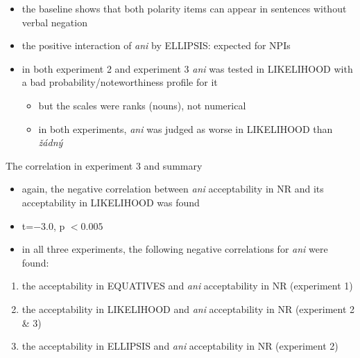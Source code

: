 \documentclass[
  ignorenonframetext,
]{beamer}
\providecommand{\tightlist}{%
  \setlength{\itemsep}{0pt}\setlength{\parskip}{0pt}}\usepackage{longtable,booktabs,array}
\newcommand{\cond}[1]{\textsc{#1}}
\begin{document}
\begin{frame}
\begin{itemize}
\tightlist
\item
  the baseline shows that both polarity items can appear in sentences
  without verbal negation
\item
  the positive interaction of \emph{ani} by \cond{ELLIPSIS}: expected
  for NPIs
\item
  in both experiment 2 and experiment 3 \emph{ani} was tested in
  \cond{LIKELIHOOD} with a bad probability/noteworthiness profile for it

  \begin{itemize}
  \tightlist
  \item
    but the scales were ranks (nouns), not numerical
  \item
    in both experiments, \emph{ani} was judged as worse in
    \cond{LIKELIHOOD} than \emph{žádný}
  \end{itemize}
\end{itemize}
\end{frame}

\begin{frame}
\begin{block}{The correlation in experiment 3 and summary}
\protect\hypertarget{the-correlation-in-experiment-3-and-summary}{}
\begin{itemize}
\tightlist
\item
  again, the negative correlation between \emph{ani} acceptability in
  \cond{NR} and its acceptability in \cond{LIKELIHOOD} was found
\item
  t=\(-3.0\), p \(<0.005\)
\end{itemize}
\end{block}
\end{frame}

\begin{frame}
\begin{itemize}
\tightlist
\item
  in all three experiments, the following negative correlations for
  \emph{ani} were found:
\end{itemize}

\begin{enumerate}
\item
  the acceptability in \cond{EQUATIVES} and \emph{ani} acceptability in
  \cond{NR} (experiment 1)
\item
  the acceptability in \cond{LIKELIHOOD} and \emph{ani} acceptability in
  \cond{NR} (experiment 2 \& 3)
\item
  the acceptability in \cond{ELLIPSIS} and \emph{ani} acceptability in
  \cond{NR} (experiment 2)
\end{enumerate}
\end{frame}
\end{document}
